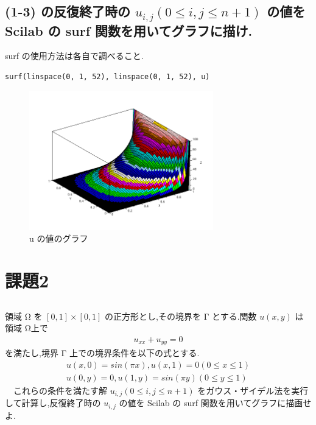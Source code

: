 \documentclass[a4j, 11pt]{jarticle}
\begin{document}
\subsection{(1-3) の反復終了時の \(u_{i,j} (0 \leq i, j \leq n + 1)\) の値を Scilab の surf 関数を用いてグラフに描け.}
\label{sec:org90447c0}
surf の使用方法は各自で調べること.\\
\begin{verbatim}
surf(linspace(0, 1, 52), linspace(0, 1, 52), u)
\end{verbatim}
\begin{figure}[htbp]
\centering
\includegraphics[width=8cm]{./1-4.png}
\caption{u の値のグラフ}
\end{figure}
\newpage
\section{課題2}
\label{sec:org4ad8538}
\subsection{}
\label{sec:org7461945}
領域 Ω を \([0, 1] \times [0, 1]\) の正方形とし,その境界を Γ とする.関数 \(u(x, y)\) は領域 Ω上で\\
\begin{eqnarray*}
u_{xx} + u_{yy} = 0
\end{eqnarray*}
を満たし,境界 Γ 上での境界条件を以下の式とする.\\
\begin{eqnarray*}
u(x, 0) = sin(\pi x), u(x, 1) = 0 (0 \leq x \leq 1) \\
u(0, y) = 0, u(1, y) = sin(\pi y) (0 \leq y \leq 1)
\end{eqnarray*}
　これらの条件を満たす解 \(u_{i,j} (0 \leq i, j \leq n + 1)\) をガウス・ザイデル法を実行して計算し,反復終了時の \(u_{i,j}\) の値を Scilab の surf 関数を用いてグラフに描画せよ.\\
\end{document}
